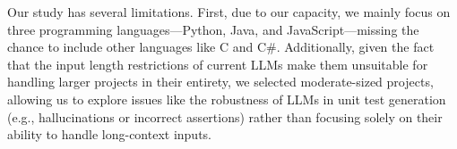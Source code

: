Our study has several limitations. First, due to our capacity, we mainly focus on three programming languages—Python, Java, and JavaScript—missing the chance to include other languages like C and C\#. Additionally, given the fact that the input length restrictions of current LLMs make them unsuitable for handling larger projects in their entirety, 
we selected moderate-sized projects, allowing us to explore issues like the robustness of LLMs in unit test generation (e.g., hallucinations or incorrect assertions) rather than focusing solely on their ability to handle long-context inputs. 
